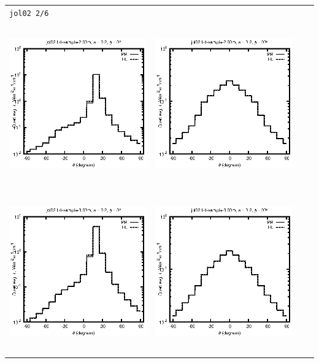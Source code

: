 \begin{tabular}{c c c c}
\multicolumn{4}{l}{\texttt{jol02 2/6}} \\
\includegraphics[height=7cm]{../eps/jol02_Ld_sample_2.00m_fwd.eps} &
\includegraphics[height=7cm]{../eps/jol02_Ld_sample_2.00m_cross.eps} \\
\includegraphics[height=7cm]{../eps/jol02_Ld_sample_3.00m_fwd.eps} &
\includegraphics[height=7cm]{../eps/jol02_Ld_sample_3.00m_cross.eps} \\

\end{tabular}
